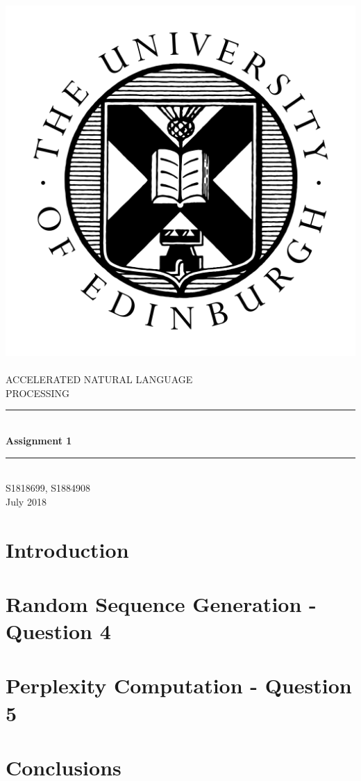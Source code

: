 \documentclass[12pt]{article}
\begin{document}
	
	
\begin{titlepage}
	\newcommand{\HRule}{\rule{\linewidth}{0.5mm}} %
	\center %
	\includegraphics[width = 0.3 \linewidth]{"./graphics/avatar-roundel-blackonwhite"}\\[0.5cm]
	\textsc{\\[1cm]\LARGE ACCELERATED NATURAL LANGUAGE \\
             \hfill\break PROCESSING}\\[2cm]

	\HRule \\[0.4cm]
	{ \huge \bfseries Assignment 1}\\[0.1cm]
	\HRule \\[1.5cm]
	\Large
	\vfill
	 S1818699, S1884908\\[0.5cm]
	{\large July 2018}
\end{titlepage}
\setlength\parindent{0pt}		
\newpage
\doublespacing
\tableofcontents
\singlespacing
\newpage
	
\section{Introduction}

\section{Random Sequence Generation - Question 4}
\section{Perplexity Computation - Question 5}
\section{Conclusions}
\end{document}
